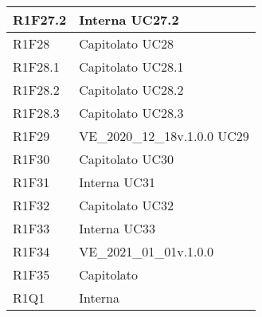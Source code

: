\begin{center}
\begin{longtable}{|p{22mm}|p{44mm}|}
R1F27.2 &
Interna \newline
UC27.2 \newline
\\
\hline

R1F28 &
Capitolato \newline
UC28 \newline
\\
\hline

R1F28.1 &
Capitolato \newline
UC28.1 \newline
\\
\hline

R1F28.2 &
Capitolato \newline
UC28.2 \newline
\\
\hline

R1F28.3 &
Capitolato \newline
UC28.3 \newline
\\
\hline

R1F29 &
VE\_2020\_12\_18v.1.0.0 \newline
UC29 \newline
\\
\hline

R1F30 &
Capitolato \newline
UC30 \newline
\\
\hline

R1F31 &
Interna \newline
UC31 \newline
\\
\hline

R1F32 &
Capitolato \newline
UC32 \newline
\\
\hline

R1F33 &
Interna \newline
UC33 \newline
\\
\hline

R1F34 &
VE\_2021\_01\_01v.1.0.0 \newline
\\
\hline

R1F35 &
Capitolato \newline
\\
\hline

 R1Q1 &
Interna \newline
\\
\hline


\end{longtable}
\end{center}
